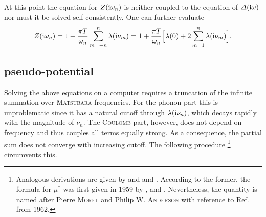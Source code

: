 At this point the equation for $Z(\mathrm i \omega_n)$ is neither coupled to the
equation of $\varDelta(\mathrm i \omega)$ nor must it be solved self-consistently. One can
further evaluate
%
\begin{equation} \label{normal-state renormalization}
    Z(\mathrm i \omega_n) = 1 + \frac{\pi T}{\omega_n} \sum_{m=-n}^n \lambda(\mathrm i \nu_m)
    = 1 + \frac{\pi T}{\omega_n}
    \Big[ \lambda(0) + 2 \sum_{m=1}^n \lambda(\mathrm i \nu_m) \Big].
\end{equation}

\subsection{ pseudo-potential}

Solving the above equations on a computer requires a truncation of the infinite
summation over \textsc{Matsubara} frequencies. For the phonon part this is
unproblematic since it has a natural cutoff through $\lambda(\mathrm i \nu_n)$, which
decays rapidly with the magnitude of $\nu_n$. The \textsc{Coulomb} part,
however, does not depend on frequency and thus couples all terms equally strong.
As a consequence, the partial sum does not converge with increasing cutoff. The
following procedure%
%
\footnote{Analogous derivations are given by 
\cite[185-188]{Schrieffer83} and  and 
\cite[Sec.~9]{AllenMitrovic82}. According to the former, the formula for $\mu^*$
was first given in 1959 by ,  and
 \cite[83]{BogoliubovTolmachevShirkov59}. Nevertheless, the
quantity is named after Pierre \textsc{Morel} and Philip W. \textsc{Anderson}
with reference to Ref.~ from 1962.}
%
circumvents this.

